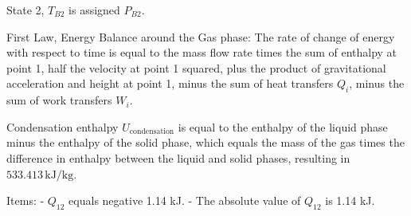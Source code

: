 State 2, \( T_{B2} \) is assigned \( P_{B2} \).

First Law, Energy Balance around the Gas phase:
The rate of change of energy with respect to time is equal to the mass flow rate times the sum of enthalpy at point 1, half the velocity at point 1 squared, plus the product of gravitational acceleration and height at point 1, minus the sum of heat transfers \( Q_i \), minus the sum of work transfers \( W_i \).

Condensation enthalpy \( U_{\text{condensation}} \) is equal to the enthalpy of the liquid phase minus the enthalpy of the solid phase, which equals the mass of the gas times the difference in enthalpy between the liquid and solid phases, resulting in \( 533.413 \, \text{kJ/kg} \).

Items:
- \( Q_{12} \) equals negative 1.14 kJ.
- The absolute value of \( Q_{12} \) is 1.14 kJ.